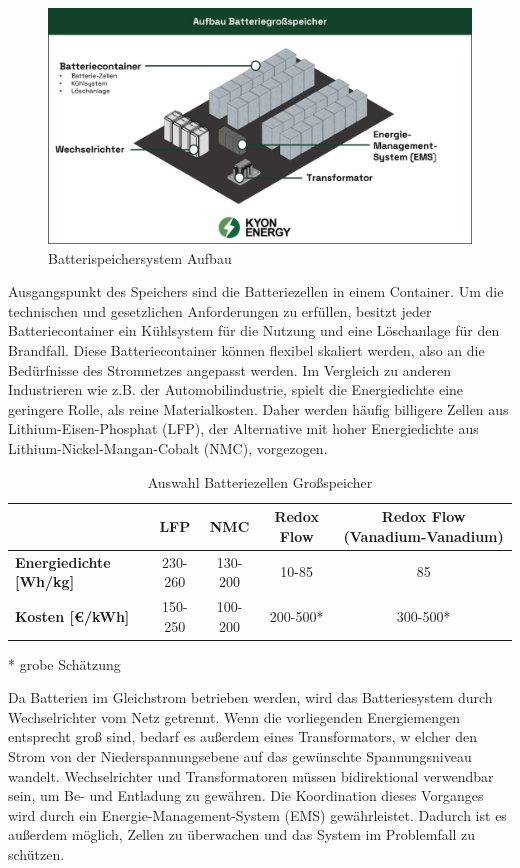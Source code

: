 \begin{figure}[h!]
    \centering
    \includegraphics[width=14cm]{Abbildungen/StandDerTechnikAbb4jpg.jpg}
    \caption{Batterispeichersystem Aufbau\cite{kyon-energy}}\label{fig:Batterispeichersystem_Aufbau}
\end{figure}

Ausgangspunkt des Speichers sind die Batteriezellen in einem Container. 
Um die technischen und gesetzlichen Anforderungen zu erfüllen, besitzt jeder Batteriecontainer ein Kühlsystem für die Nutzung und eine Löschanlage für den Brandfall. 
Diese Batteriecontainer können flexibel skaliert werden, also an die Bedürfnisse des Stromnetzes angepasst werden. 
Im Vergleich zu anderen Industrieren wie z.B. der Automobilindustrie, spielt die Energiedichte eine geringere Rolle, als reine Materialkosten. 
Daher werden häufig billigere Zellen aus Lithium-Eisen-Phosphat (LFP), der Alternative mit hoher Energiedichte aus Lithium-Nickel-Mangan-Cobalt (NMC), vorgezogen.

\begin{table}[htbp]
    \centering
    \caption{Auswahl Batteriezellen Großspeicher\cite{poworks-comparison}}
    \label{tab:Auswahl_Batteriezellen_Großspeicher}
    \begin{tabular}{lcccc}
       \toprule
        & \textbf{LFP} & \textbf{NMC} & \textbf{Redox Flow} & \textbf{Redox Flow (Vanadium-Vanadium)} \\
        \midrule
        \textbf{Energiedichte [Wh/kg]} & 230-260 & 130-200 & 10-85 & 85 \\
        \textbf{Kosten [€/kWh]} & 150-250 & 100-200 & 200-500* & 300-500* \\
        \bottomrule
    \end{tabular}
\end{table}

* grobe Schätzung

Da Batterien im Gleichstrom betrieben werden, wird das Batteriesystem durch Wechselrichter vom Netz getrennt. 
Wenn die vorliegenden Energiemengen entsprecht groß sind, bedarf es außerdem eines Transformators, w
elcher den Strom von der Niederspannungsebene auf das gewünschte Spannungsniveau wandelt. 
Wechselrichter und Transformatoren müssen bidirektional verwendbar sein, um Be- und Entladung zu gewähren. 
Die Koordination dieses Vorganges wird durch ein Energie-Management-System (EMS) gewährleistet. 
Dadurch ist es außerdem möglich, Zellen zu überwachen und das System im Problemfall zu schützen\cite{kyon-energy}.

